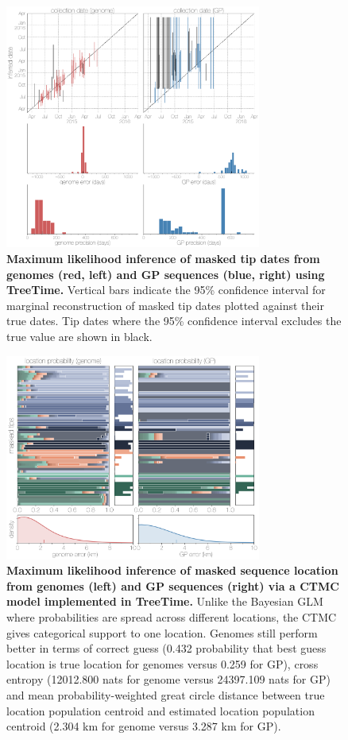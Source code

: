 \documentclass[11pt,oneside,letterpaper]{article}
\begin{document}
\begin{figure}[h]
 \centering
	\includegraphics[width=0.75\textwidth]{supp_figures/sfigX_treetimeDates.png}
	\caption{\textbf{Maximum likelihood inference of masked tip dates from genomes (red, left) and GP sequences (blue, right) using TreeTime.}
  Vertical bars indicate the 95\% confidence interval for marginal reconstruction of masked tip dates plotted against their true dates.
  Tip dates where the 95\% confidence interval excludes the true value are shown in black.
	}
	\label{TTdates}
\end{figure}

\begin{figure}[h]
 \centering
	\includegraphics[width=0.75\textwidth]{supp_figures/sfigX_treetimeLocations.png}
	\caption{\textbf{Maximum likelihood inference of masked sequence location from genomes (left) and GP sequences (right) via a CTMC model implemented in TreeTime.}
  Unlike the Bayesian GLM where probabilities are spread across different locations, the CTMC gives categorical support to one location.
  Genomes still perform better in terms of correct guess (0.432 probability that best guess location is true location for genomes versus 0.259 for GP), cross entropy (12012.800 nats for genome versus 24397.109 nats for GP) and mean probability-weighted great circle distance between true location population centroid and estimated location population centroid (2.304 km for genome versus 3.287 km for GP).
	}
	\label{TTlocations}
\end{figure}
\end{document}
